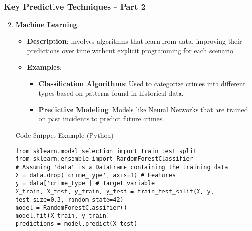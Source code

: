 \documentclass[aspectratio=169]{beamer}
\begin{document}
\begin{frame}[fragile]
    \frametitle{Key Predictive Techniques - Part 2}
    \begin{enumerate}
        \setcounter{enumi}{1}
        \item \textbf{Machine Learning}
        \begin{itemize}
            \item \textbf{Description}: Involves algorithms that learn from data, improving their predictions over time without explicit programming for each scenario.
            \item \textbf{Examples}:
            \begin{itemize}
                \item \textbf{Classification Algorithms}: Used to categorize crimes into different types based on patterns found in historical data.
                \item \textbf{Predictive Modeling}: Models like Neural Networks that are trained on past incidents to predict future crimes.
            \end{itemize}
        \end{itemize}
        
        \begin{block}{Code Snippet Example (Python)}
        \begin{lstlisting}[basicstyle=\ttfamily]
from sklearn.model_selection import train_test_split
from sklearn.ensemble import RandomForestClassifier
# Assuming 'data' is a DataFrame containing the training data
X = data.drop('crime_type', axis=1) # Features
y = data['crime_type'] # Target variable
X_train, X_test, y_train, y_test = train_test_split(X, y, test_size=0.3, random_state=42)
model = RandomForestClassifier()
model.fit(X_train, y_train)
predictions = model.predict(X_test)
        \end{lstlisting}
        \end{block}
    \end{enumerate}
\end{frame}
\end{document}
